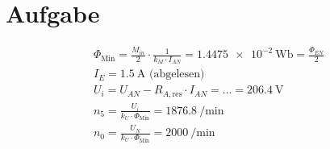 \documentclass[10pt,a4paper]{article}
\begin{document}
\section{Aufgabe}
\begin{align*}
\Phi_\text{Min} = \frac{M_{in}}{2} \cdot \frac{1}{k_M \cdot I_{AN}} = \SI{1.4475e-2}{\weber} = \frac{\Phi_{EN}}{2}\\
I_E = \SI{1.5}{\ampere} \text{ (abgelesen)}\\
U_i = U_{AN} - R_{A, \text{res}} \cdot I_{AN} = \ldots = \SI{206.4}{\volt}\\
n_5 = \frac{U_i}{k_U \cdot \Phi_\text{Min}} = \SI{1876.8}{\per\minute}\\
n_0 = \frac{U_N}{k_U \cdot \Phi_\text{Min}} = \SI{2000}{\per\minute}
\end{align*}
\end{document}
